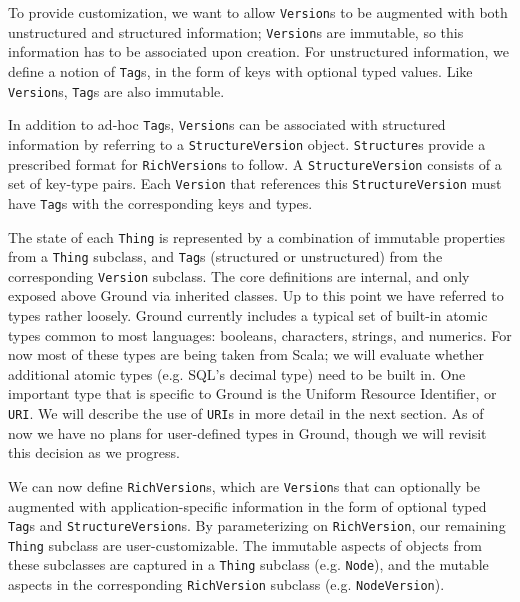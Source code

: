 \documentclass{article}
\newenvironment{tldr}[1][r]
  {\wrapfigure{#1}{0.33\textwidth}\tcolorbox}
  {\endtcolorbox\endwrapfigure}
\newcommand{\core}{core\xspace}
\newcommand{\version}{\texttt{Version}\xspace}
\newcommand{\richversion}{\texttt{RichVersion}\xspace}
\newcommand{\thing}{\texttt{Thing}\xspace}
\newcommand{\node}{\texttt{Node}\xspace}
\newcommand{\structure}{\texttt{Structure}\xspace}
\newcommand{\tag}{\texttt{Tag}\xspace}
\newcommand{\uri}{\texttt{URI}\xspace}
\newcommand{\jmh}[1]{{\textcolor{red}{#1---jmh}}}
\begin{document}
To provide customization, we want to allow {\version}s to be augmented
with both unstructured and structured information; {\version}s are
immutable, so this information has to be associated upon creation. For unstructured information, 
we define a notion of {\tag}s, in the 
form of keys with optional typed values.  Like {\version}s, {\tag}s are also immutable.

In addition to ad-hoc {\tag}s,
{\version}s can be associated with structured information by referring to a
\texttt{StructureVersion} object. {\structure}s provide a prescribed format for {\richversion}s to follow. 
A \texttt{StructureVersion} consists of a set of key-type pairs.
Each \version that references this \texttt{StructureVersion} must have {\tag}s with the corresponding 
keys and types.


\begin{tldr}
The state of each \thing is represented by a combination of immutable properties from a \thing subclass, and {\tag}s (structured or unstructured) from the corresponding \version subclass.
The \core definitions are internal, and only exposed above Ground via inherited classes.
\end{tldr}
Up to this point we have referred to types rather loosely.  Ground currently includes 
a typical set of built-in atomic types common to most languages: booleans, characters, strings, and
numerics.  For now most of these types are being taken from Scala; we will evaluate whether additional 
atomic types (e.g. SQL's decimal type) need to be built in.  One important type that is specific to 
Ground is the Uniform Resource Identifier, or \uri.  We will describe the use of {\uri}s in more detail in the next section.  As of now we have no plans for user-defined types in Ground, though we will revisit
this decision as we progress.

We can now define {\richversion}s, which are {\version}s that can optionally be augmented with application-specific information in the form 
of optional typed {\tag}s and \texttt{StructureVersion}s.  By parameterizing on \richversion, our remaining \thing subclass are user-customizable.  The immutable aspects of objects from these subclasses are captured in a \thing subclass
(e.g. \node), and the mutable aspects in the corresponding \richversion subclass (e.g.
\texttt{NodeVersion}).  
\end{document}
